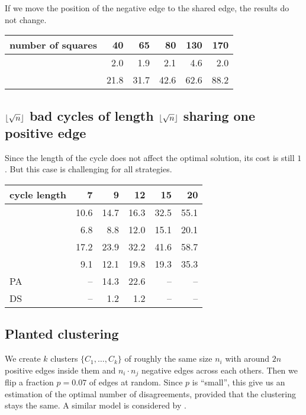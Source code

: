 If we move the position of the negative edge to the shared edge, the results
do not change.

\begin{center}
\begin{tabular}{lrrrrr}
\toprule
number of squares &  40  &  65  &  80  &  130 &  170 \\
\midrule
\pot{} &  2.0 &  1.9 &  2.1 &  4.6 &  2.0 \\
\pat{} & 21.8 & 31.7 & 42.6 & 62.6 & 88.2 \\
\bottomrule
\end{tabular}
\end{center}

\subsection{$\floor*{\sqrt{n}}$ bad cycles of length $\floor*{\sqrt{n}}$
	sharing one positive edge}
\label{sub:mixed}

Since the length of the cycle does not affect the optimal solution, its cost
is still $1$. But this case is challenging for all strategies.

\begin{center}
\begin{tabular}{lrrrrr}
\toprule
cycle length & 7    & 9    & 12   & 15   & 20 \\
\midrule
\pot{}       & 10.6 & 14.7 & 16.3 & 32.5 & 55.1 \\
\pat{}       & 6.8  & 8.8  & 12.0 & 15.1 & 20.1 \\
\nnot{}      & 17.2 & 23.9 & 32.2 & 41.6 & 58.7 \\
\nat{}       & 9.1  & 12.1 & 19.8 & 19.3 & 35.3 \\
PA           & --   & 14.3 & 22.6 & --   & --\\
DS           & --   & 1.2  & 1.2  & --   & --\\
\bottomrule
\end{tabular}
\end{center}


\subsection{Planted clustering}

We create $k$ clusters $\{C_1, \ldots, C_k\}$ of roughly the same size $n_i$
with around $2n$ positive edges inside them and $n_i\cdot n_j$ negative edges
across each others. Then we flip a fraction $p=0.07$ of edges at random.
Since $p$ is \enquote{small}, this give us an estimation of the optimal number
of disagreements, provided that the clustering stays the same. A similar model
is considered by \textcite{Makarychev2014}.

